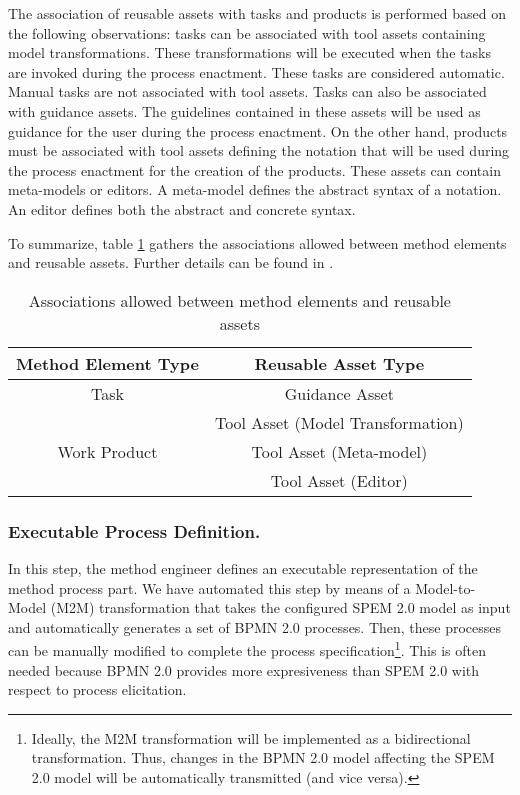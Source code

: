 \documentclass[runningheads,a4paper]{llncs}
\begin{document}
The association of reusable assets with tasks and products is performed based on
the following observations: tasks can be associated with tool assets
containing model transformations. These transformations will be executed when
the tasks are invoked during the process enactment. These tasks are
considered automatic. Manual tasks are not associated with tool assets. Tasks
can also be associated with guidance assets. The guidelines contained in these
assets will be used as guidance for the user during the process enactment. On
the other hand, products must be associated with tool assets defining the
notation that will be used during the process enactment for the creation of the
products. These assets can contain meta-models or editors. A meta-model defines
the abstract syntax of a notation. An editor defines both the abstract and
concrete syntax.

To summarize, table \ref{tableAssociations} gathers the associations allowed
between method elements and reusable assets. Further details can be found in
\cite{Cervera10,Cervera11}.

\begin{table}
\caption{Associations allowed between method elements and reusable assets}
\centering
\begin{tabular}{| c | c |}
\cline{1-2}
\multicolumn{1}{|c|}{\textbf{Method Element Type}} &
\multicolumn{1}{|c|}{\textbf{Reusable Asset Type}}
\\
\hline
Task & Guidance Asset\\
\cline{2-2}
& Tool Asset (Model Transformation)\\
\hline
Work Product & Tool Asset (Meta-model)\\
\cline{2-2}
& Tool Asset (Editor)\\
\hline
\end{tabular}
\label{tableAssociations}
\end{table}

\subsubsection{Executable Process Definition.}

In this step, the method engineer defines an executable representation of the
method process part. We have automated this step by means of a Model-to-Model
(M2M) transformation that takes the configured SPEM 2.0 model as input and
automatically generates a set of BPMN 2.0 processes. Then, these processes can
be manually modified to complete the process specification\footnote{Ideally, the
M2M transformation will be implemented as a bidirectional transformation. Thus,
changes in the BPMN 2.0 model affecting the SPEM 2.0 model will be automatically
transmitted (and vice versa).}. This is often needed because BPMN 2.0 provides
more expresiveness than SPEM 2.0 with respect to process elicitation.
\end{document}
